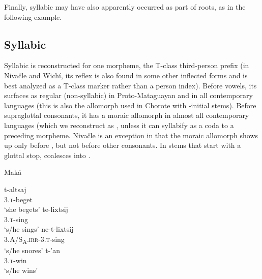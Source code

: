 Finally, syllabic  may have also apparently occurred as part of roots, as in the following example.

\begin{exe}
    \ex \spoon
\end{exe}

\subsection{Syllabic }\label{syllabic-t}
Syllabic  is reconstructed for one morpheme, the T-class third-person prefix  (in Nivaĉle and Wichí, its reflex is also found in some other inflected forms and is best analyzed as a T-class marker rather than a person index). Before vowels, its surfaces as regular (non-syllabic)  in Proto-Mataguayan and in all contemporary languages (this is also the allomorph used in Chorote with \mbox{-}initial stems). Before supraglottal consonants, it has a moraic allomorph in almost all contemporary languages (which we reconstruct as , unless it can syllabify as a coda to a preceding morpheme. Nivaĉle is an exception in that the moraic allomorph shows up only before , but not before other consonants. In stems that start with a glottal stop,  coalesces into .

\ea\label{ex:syllt:mak}
Maká \citep[118, 121, 244, 329]{AG99}\\
    \begin{xlist}
        \ex \gll t-altsaj\\
             3.\textsc{t}-beget\\
             \glt `she begets'
        \ex \gll te-lixtsij\\
             3.\textsc{t}-sing\\
             \glt `s/he sings'
        \ex \gll ne-t-lixtsij\\
             3.A/S\textsubscript{A}.{\textsc{irr}}-3.\textsc{t}-sing\\
             \glt `s/he snores'
        \ex \gll t-’an\\
             3.\textsc{t}-win\\
             \glt `s/he wins'
    \end{xlist}
\z

